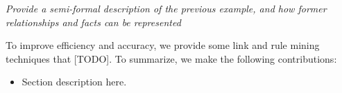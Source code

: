 \begin{example}
\textit{Provide a semi-formal description of the previous example, and how former relationships and facts can be represented}
\end{example}
\medskip

To improve efficiency and accuracy, we provide some link and rule mining techniques that {\color{red} [TODO]}. To summarize, we make the following contributions:
\begin{itemize}
	\item Section description here.
\end{itemize}
